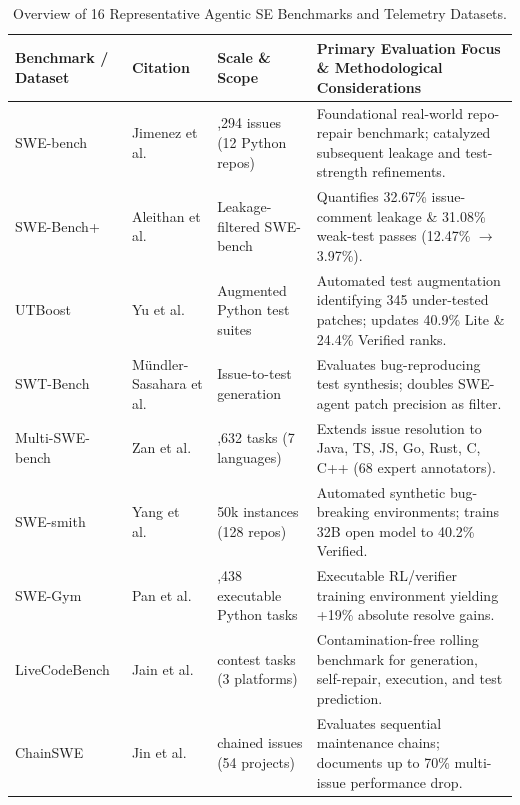 \documentclass[10pt,twocolumn,a4paper]{article}
\begin{document}
\begin{table}[t!]
\centering
\caption{Overview of 16 Representative Agentic SE Benchmarks and Telemetry Datasets.}
\label{tab:benchmarks}
\scriptsize
\setlength{\tabcolsep}{3.6pt}
\begin{tabularx}{\textwidth}{>{\raggedright\arraybackslash}p{2.15cm} >{\raggedright\arraybackslash}p{2.65cm} >{\raggedright\arraybackslash}p{2.55cm} X}
\toprule
\textbf{Benchmark / Dataset} & \textbf{Citation} & \textbf{Scale \& Scope} & \textbf{Primary Evaluation Focus \& Methodological Considerations} \\
\midrule
SWE-bench & Jimenez et al.~\cite{jimenez2024swebench} & 2,294 issues (12 Python repos) & Foundational real-world repo-repair benchmark; catalyzed subsequent leakage and test-strength refinements. \\
SWE-Bench+ & Aleithan et al.~\cite{aleithan2026swebench} & Leakage-filtered SWE-bench & Quantifies 32.67\% issue-comment leakage \& 31.08\% weak-test passes (12.47\% $\rightarrow$ 3.97\%). \\
UTBoost & Yu et al.~\cite{yu2025utboost} & Augmented Python test suites & Automated test augmentation identifying 345 under-tested patches; updates 40.9\% Lite \& 24.4\% Verified ranks. \\
SWT-Bench & M\"undler-Sasahara et al.~\cite{mndlersasahara2024swtbench} & Issue-to-test generation & Evaluates bug-reproducing test synthesis; doubles SWE-agent patch precision as filter. \\
Multi-SWE-bench & Zan et al.~\cite{zan2025multiswebench} & 1,632 tasks (7 languages) & Extends issue resolution to Java, TS, JS, Go, Rust, C, C++ (68 expert annotators). \\
SWE-smith & Yang et al.~\cite{yang2025swesmith} & 50k instances (128 repos) & Automated synthetic bug-breaking environments; trains 32B open model to 40.2\% Verified. \\
SWE-Gym & Pan et al.~\cite{pan2025training} & 2,438 executable Python tasks & Executable RL/verifier training environment yielding +19\% absolute resolve gains. \\
LiveCodeBench & Jain et al.~\cite{jain2025livecodebench} & 400 contest tasks (3 platforms) & Contamination-free rolling benchmark for generation, self-repair, execution, and test prediction. \\
ChainSWE & Jin et al.~\cite{jin2026chainswe} & 304 chained issues (54 projects) & Evaluates sequential maintenance chains; documents up to 70\% multi-issue performance drop. \\

\end{tabularx}
\end{table}
\end{document}
